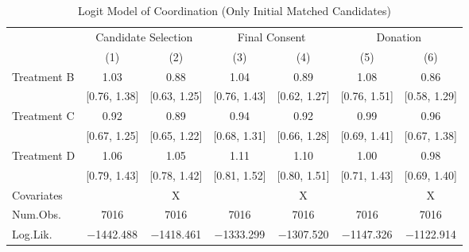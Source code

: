 \documentclass[12pt, a4paper]{article}
\begin{document}
\begin{landscape}\begin{table}[H]

\caption{\label{tab:logit-coordinate-initial-matched}Logit Model of Coordination (Only Initial Matched Candidates)}
\centering
\fontsize{8}{10}\selectfont
\begin{threeparttable}
\begin{tabular}[t]{lcccccc}
\toprule
\multicolumn{1}{c}{ } & \multicolumn{2}{c}{Candidate Selection} & \multicolumn{2}{c}{Final Consent} & \multicolumn{2}{c}{Donation} \\
\cmidrule(l{3pt}r{3pt}){2-3} \cmidrule(l{3pt}r{3pt}){4-5} \cmidrule(l{3pt}r{3pt}){6-7}
  & (1) & (2) & (3) & (4) & (5) & (6)\\
\midrule
Treatment B & \num{1.03} & \num{0.88} & \num{1.04} & \num{0.89} & \num{1.08} & \num{0.86}\\
 & {}[\num{0.76}, \num{1.38}] & {}[\num{0.63}, \num{1.25}] & {}[\num{0.76}, \num{1.43}] & {}[\num{0.62}, \num{1.27}] & {}[\num{0.76}, \num{1.51}] & {}[\num{0.58}, \num{1.29}]\\
Treatment C & \num{0.92} & \num{0.89} & \num{0.94} & \num{0.92} & \num{0.99} & \num{0.96}\\
 & {}[\num{0.67}, \num{1.25}] & {}[\num{0.65}, \num{1.22}] & {}[\num{0.68}, \num{1.31}] & {}[\num{0.66}, \num{1.28}] & {}[\num{0.69}, \num{1.41}] & {}[\num{0.67}, \num{1.38}]\\
Treatment D & \num{1.06} & \num{1.05} & \num{1.11} & \num{1.10} & \num{1.00} & \num{0.98}\\
 & {}[\num{0.79}, \num{1.43}] & {}[\num{0.78}, \num{1.42}] & {}[\num{0.81}, \num{1.52}] & {}[\num{0.80}, \num{1.51}] & {}[\num{0.71}, \num{1.43}] & {}[\num{0.69}, \num{1.40}]\\
\midrule
Covariates &  & X &  & X &  & X\\
Num.Obs. & \num{7016} & \num{7016} & \num{7016} & \num{7016} & \num{7016} & \num{7016}\\
Log.Lik. & \num{-1442.488} & \num{-1418.461} & \num{-1333.299} & \num{-1307.520} & \num{-1147.326} & \num{-1122.914}\\
\bottomrule
\end{tabular}
\begin{tablenotes}

\end{tablenotes}
\end{threeparttable}
\end{table}
\end{landscape}
\end{document}
